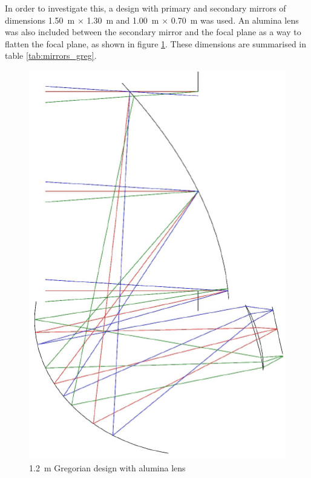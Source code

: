 \documentclass[11pt,a4paper]{article}
\begin{document}
In order to investigate this, a design with primary and secondary mirrors of dimensions 1.50~m $\times$ 1.30~m and 1.00~m $\times$ 0.70~m was used. An alumina lens was also included between the secondary mirror and the focal plane as a way to flatten the focal plane, as shown in figure \ref{fig:gregschem_lens}. These dimensions are summarised in table \ref{tab:mirrors_greg}.
\begin{figure}[htbp]
	\centering
	\includegraphics[scale=0.5]{core_greg_lens.png}
	\caption{1.2~m Gregorian design with alumina lens}
	\label{fig:gregschem_lens}
\end{figure}
\end{document}
